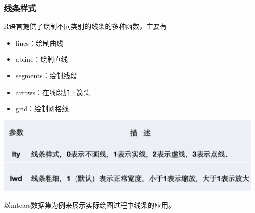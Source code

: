 \documentclass[
]{book}
\providecommand{\tightlist}{%
  \setlength{\itemsep}{0pt}\setlength{\parskip}{0pt}}
\begin{document}
\hypertarget{ux7ebfux6761ux6837ux5f0f}{%
\subsubsection{线条样式}\label{ux7ebfux6761ux6837ux5f0f}}

R语言提供了绘制不同类别的线条的多种函数，主要有

\begin{itemize}
\tightlist
\item
  lines：绘制曲线
\item
  abline：绘制直线
\item
  segments：绘制线段
\item
  arrows：在线段加上箭头
\item
  grid：绘制网格线
\end{itemize}

\includegraphics{figure/6.jpg}

以mtcars数据集为例来展示实际绘图过程中线条的应用。
\end{document}
